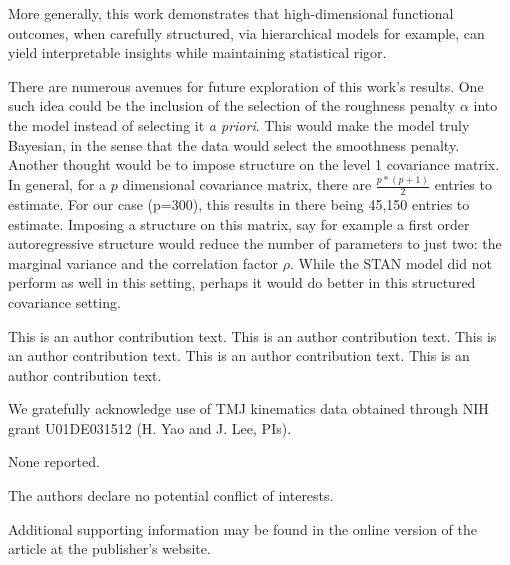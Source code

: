 \documentclass[AMA,Times1COL]{WileyNJDv5} %
\begin{document}
More generally, this work demonstrates that high-dimensional functional outcomes, when  carefully structured, via hierarchical models for example, can yield interpretable insights while maintaining statistical rigor.

There are numerous avenues for future exploration of this work's results.  One such idea could be the inclusion of the selection of the roughness penalty \(\alpha\) into the model instead of selecting it \emph{a priori}.  This would make the model truly Bayesian, in the sense that the data would select the smoothness penalty.  Another thought would be to impose structure on the level 1 covariance matrix.  In general, for a \(p\) dimensional covariance matrix, there are \(\frac{p*(p+1)}{2}\) entries to estimate.  For our case (p=300), this results in there being 45,150 entries to estimate.  Imposing a structure on this matrix, say for example a first order autoregressive structure would reduce the number of parameters to just two: the marginal variance and the correlation factor \(\rho\).  While the STAN model did not perform as well in this setting, perhaps it would do better in this structured covariance setting.  

{}

This is an author contribution text. This is an author contribution text. This is an author contribution text. This is an author contribution text. This is an author contribution text.

We gratefully acknowledge use of TMJ kinematics data obtained through NIH grant U01DE031512 (H. Yao and J. Lee, PIs). 



None reported.


The authors declare no potential conflict of interests.

%
%



Additional supporting information may be found in the
online version of the article at the publisher’s website.


\appendix

\end{document}
